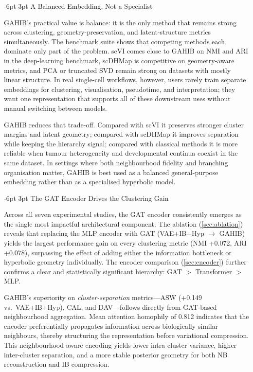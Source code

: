 \documentclass[preprint,12pt]{elsarticle}
\makeatletter
\renewcommand\subsection{\@startsection{subsection}{2}{\z@}%
  {-6pt \@plus -2pt \@minus -2pt}%
  {3pt \@plus 1pt \@minus 1pt}%
  {\normalfont\large\bfseries}}
\makeatother
\begin{document}
\subsection{A Balanced Embedding, Not a Specialist}

GAHIB's practical value is balance: it is the only method that remains
strong across clustering, geometry-preservation, and latent-structure
metrics simultaneously.
The benchmark suite shows that competing methods each dominate only part
of the problem.
scVI comes close to GAHIB on NMI and ARI in the deep-learning benchmark,
scDHMap is competitive on geometry-aware metrics, and PCA or truncated
SVD remain strong on datasets with mostly linear structure.
In real single-cell workflows, however, users rarely train separate
embeddings for clustering, visualisation, pseudotime, and interpretation;
they want one representation that supports all of these downstream uses
without manual switching between models.

GAHIB reduces that trade-off. Compared with scVI it preserves stronger
cluster margins and latent geometry; compared with scDHMap it improves
separation while keeping the hierarchy signal; compared with classical
methods it is more reliable when tumour heterogeneity and developmental
continua coexist in the same dataset. In settings where both
neighbourhood fidelity and branching organisation matter, GAHIB is best
used as a balanced general-purpose embedding rather than as a
specialised hyperbolic model.

\subsection{The GAT Encoder Drives the Clustering Gain}

Across all seven experimental studies, the GAT encoder consistently emerges
as the single most impactful architectural component.
The ablation (\cref{sec:ablation}) reveals that replacing the MLP encoder
with GAT (VAE+IB+Hyp $\to$ GAHIB) yields the largest performance gain on
every clustering metric (NMI +0.072, ARI +0.078), surpassing the effect
of adding either the information bottleneck or hyperbolic geometry individually.
The encoder comparison (\cref{sec:encoder}) further confirms a clear
and statistically significant hierarchy: GAT $>$ Transformer $>$ MLP.

GAHIB's superiority on \emph{cluster-separation} metrics---ASW (+0.149
vs.\ VAE+IB+Hyp), CAL, and DAV---follows directly from GAT-based
neighbourhood aggregation.
Mean attention homophily of 0.812 indicates that the encoder preferentially
propagates information across biologically similar neighbours, thereby
structuring the representation before variational compression.
This neighbourhood-aware encoding yields lower intra-cluster variance,
higher inter-cluster separation, and a more stable posterior geometry for
both NB reconstruction and IB compression.
\end{document}
